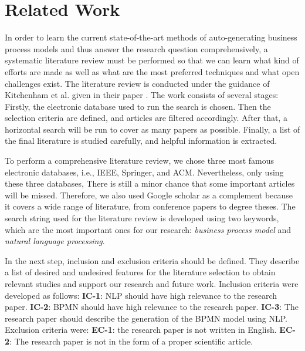 \chapter{Related Work}

	In order to learn the current state-of-the-art methods of auto-generating business process models and thus answer the research question comprehensively, a systematic literature review must be performed so that we can learn what kind of efforts are made as well as what are the most preferred techniques and what open challenges exist. The literature review is conducted under the guidance of Kitchenham et al. given in their paper \cite{literature_review_guidance}. The work consists of several stages: Firstly, the electronic database used to run the search is chosen. Then the selection criteria are defined, and articles are filtered accordingly. After that, a horizontal search will be run to cover as many papers as possible. Finally, a list of the final literature is studied carefully, and helpful information is extracted.
	
	To perform a comprehensive literature review, we chose three most famous electronic databases, i.e., IEEE, Springer, and ACM. Nevertheless, only using these three databases, There is still a minor chance that some important articles will be missed. Therefore, we also used Google scholar as a complement because it covers a wide range of literature, from conference papers to degree theses. The search string used for the literature review is developed using two keywords, which are the most important ones for our research: \textit{business process model} and \textit{natural language processing}.
	
	In the next step, inclusion and exclusion criteria should be defined. They describe a list of desired and undesired features for the literature selection to obtain relevant studies and support our research and future work. Inclusion criteria were developed as follows: \textbf{IC-1}: NLP should have high relevance to the research paper. \textbf{IC-2}: BPMN should have high relevance to the research paper. \textbf{IC-3}: The research paper should describe the generation of the BPMN model using NLP. Exclusion criteria were: \textbf {EC-1}: the research paper is not written in English. \textbf{EC-2}: The research paper is not in the form of a proper scientific article. 
	

